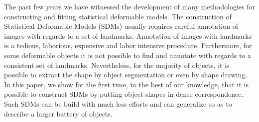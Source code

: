 
The past few years we have witnessed the development of many methodologies for constructing and fitting statistical deformable models. The construction of Statistical Deformable Models (SDMs) usually requires careful annotation of images with regards to a set of landmarks. Annotation of images with landmarks is a tedious, laborious, expensive and labor intensive procedure. Furthermore, for some deformable objects it is not possible to find and annotate with regards to a consistent set of landmarks. Nevertheless, for the majority of objects, it is possible to extract the shape by object segmentation or even by shape drawing. In this paper, we show for the first time, to the best of our knowledge, that it is possible to construct SDMs by putting object shapes in dense correspondence. Such SDMs can be build with much less efforts and can generalize so as to describe a larger battery of objects. 